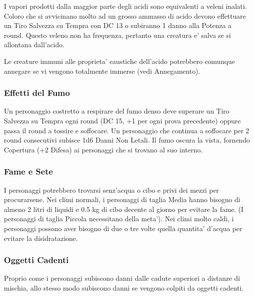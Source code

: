 \documentclass[a4paper,11pt,twoside,openany]{book}
\begin{document}
{		I vapori prodotti dalla maggior parte degli acidi sono equivalenti a veleni inalati. Coloro che si avvicinano molto ad un grosso ammasso di acido devono effettuare un Tiro Salvezza su Tempra con DC 13 o subiranno 1 danno alla Potenza a round. Questo veleno non ha frequenza, pertanto una creatura e' salva se si allontana dall'acido.
		
		Le creature immuni alle proprieta' caustiche dell'acido potrebbero comunque annegare se vi vengono totalmente immerse (vedi Annegamento).
		
		\subsubsection{Effetti del Fumo}
		
		\label{effetti-del-fumo}
		
		Un personaggio costretto a respirare del fumo denso deve superare un Tiro Salvezza su Tempra ogni round (DC 15, +1 per ogni prova precedente) oppure passa il round a tossire e soffocare. Un personaggio che continua a soffocare per 2 round consecutivi subisce 1d6 Danni Non Letali. Il fumo oscura la vista, fornendo Copertura (+2 Difesa) ai personaggi che si trovano al suo interno.
		
		\subsubsection{Fame e Sete}
		
		\label{fame-e-sete}
		
		I personaggi potrebbero trovarsi senz'acqua o cibo e privi dei mezzi per procurarsene. Nei climi normali, i personaggi di taglia Media hanno bisogno di almeno 2 litri di liquidi e 0.5 kg di cibo decente al giorno per evitare la fame. (I personaggi di taglia Piccola necessitano della meta'). Nei climi molto caldi, i personaggi possono aver bisogno di due o tre volte quella quantita' d'acqua per evitare la disidratazione.
		
		\subsubsection{Oggetti Cadenti}
		
		\label{oggetti-cadenti}
		
		Proprio come i personaggi subiscono danni dalle cadute superiori a distanze di mischia, allo stesso modo subiscono danni se vengono colpiti da oggetti cadenti.
		
}
\end{document}
